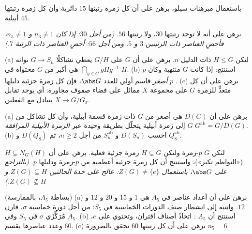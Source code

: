 \begin{exercise}[$\star$]\label{exo:b3:groups:6}
باستعمال مبرهنات سيلو، برهن على أن كل زمرة رتبتها $15$ دائرية وأن
كل زمرة رتبتها $45$ أبيلية.
\end{exercise}

\begin{exercise}[$\star\star$]\label{exo:b3:groups:7}
برهن على أنه لا توجد  رتبتها $30$، ولا  رتبتها
$56$. \emph{(من أجل $30$: إذا كان $n_3 \neq 1$ و $n_5 \neq 1$،
فأحصِ العناصر ذات الرتبتين $3$ و $5$. ومن أجل $56$: أحصِ العناصر
ذات الرتبة $7$.)}
\end{exercise}

\begin{exercise}[$\star\star$]\label{exo:b3:groups:8}
(a) لتكن $H \leq G$ ذات الدليل $n$. برهن على أن  $G$ على $G/H$
يعطي تشاكلًا $G \to S_n$ نواته $\bigcap_{g \in
G} gHg^{-1}$ هي أكبر 
من $G$ محتواة في $H$.
(b) استنتج: إذا كانت $G$ منتهية وكان $p$ \emph{أصغر} قاسم أولي
للعدد $\abs G$، فإن كل زمرة جزئية دليلها $p$ .
(c) برهن على أن كل  متعدٍّ للزمرة $G$ على مجموعة $X$ مماثل
 على فضاء صفوف مجاورة: أي يوجد تقابل $X
\to G/G_x$ يتبادل مع
الفعلين.
\end{exercise}

\begin{exercise}[$\star\star$]\label{exo:b3:groups:9}
(a) برهن على أن $D(G)$ هي أصغر  من $G$ ذات زمرة
قسمة أبيلية، وأن كل تشاكل من $G$ إلى زمرة أبيلية يتحلّل بطريقة
وحيدة عبر \emph{الزمرة الأبيلية المرافقة} $G^{\mathrm{ab}} = G/D(G)$.
(b) احسب $D(S_n)$ و $S_n^{\mathrm{ab}}$ من أجل $n \geq 2$، ثم $D(Q_8)$ و
$Q_8^{\mathrm{ab}}$.
\end{exercise}

\begin{exercise}[$\star\star$]\label{exo:b3:groups:10}
لتكن $G$ $p$-زمرة ولتكن $H \subsetneq G$ زمرة جزئية فعلية. برهن
على أن $H \subsetneq N_G(H)$ («النواظم تكبر»)، واستنتج أن كل زمرة جزئية أعظمية
من $p$-زمرة  ودليلها $p$. \emph{(بالتراجع على $\abs G$،
باستعمال $Z(G) \neq \{e\}$: عالج على حدة الحالتين $Z(G) \subseteq H$ و $Z(G) \not\subseteq H$.)}
\end{exercise}

\begin{exercise}[$\star\star\star$]\label{exo:b3:groups:11}
(بساطة $A_5$، بالممارسة)
(a) برهن على أن أعداد عناصر  في $A_5$ هي $1$ و $15$
و $20$ و $12$ و $12$. وانتبه إلى انشطار صنف الدورات الخماسية في
$S_5$: من أجل دورة خماسية $\sigma$، قارن مُرَكِّزَي $\sigma$ في
$S_5$ وفي $A_5$.
(b) استنتج أن $A_5$ :  اتحادُ أصناف
اقتران، وتحتوي على $e$، وعدد عناصرها يقسم $60$.
(c) برهن على أن كل  رتبتها $60$ تحقق بالضرورة $n_5 =
6$.
\end{exercise}

